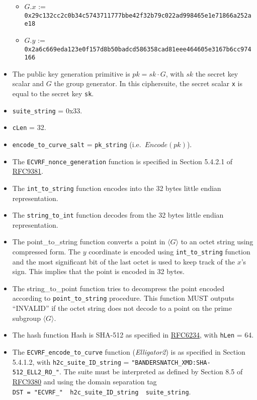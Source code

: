 \documentclass[
]{article}
\providecommand{\tightlist}{%
  \setlength{\itemsep}{0pt}\setlength{\parskip}{0pt}}
\begin{document}
\begin{itemize}
  \begin{itemize}
  \tightlist
  \item
    \(G.x\) :=
    \texttt{0x29c132cc2c0b34c5743711777bbe42f32b79c022ad998465e1e71866a252ae18}
  \item
    \(G.y\) :=
    \texttt{0x2a6c669eda123e0f157d8b50badcd586358cad81eee464605e3167b6cc974166}
  \end{itemize}
\item
  The public key generation primitive is \(pk = sk \cdot G\), with
  \(sk\) the secret key scalar and \(G\) the group generator. In this
  ciphersuite, the secret scalar \texttt{x} is equal to the secret key
  \texttt{sk}.
\item
  \texttt{suite\_string} = 0x33.
\item
  \texttt{cLen} = 32.
\item
  \texttt{encode\_to\_curve\_salt} = \texttt{pk\_string}
  (i.e.~\(Encode(pk)\)).
\item
  The \texttt{ECVRF\_nonce\_generation} function is specified in Section
  5.4.2.1 of \href{https://datatracker.ietf.org/doc/rfc9381/}{RFC9381}.
\item
  The \texttt{int\_to\_string} function encodes into the 32 bytes little
  endian representation.
\item
  The \texttt{string\_to\_int} function decodes from the 32 bytes little
  endian representation.
\item
  The point\_to\_string function converts a point in
  \(\langle G \rangle\) to an octet string using compressed form. The
  \(y\) coordinate is encoded using \texttt{int\_to\_string} function
  and the most significant bit of the last octet is used to keep track
  of the \(x\)'s sign. This implies that the point is encoded in 32
  bytes.
\item
  The string\_to\_point function tries to decompress the point encoded
  according to \texttt{point\_to\_string} procedure. This function MUST
  outputs ``INVALID'' if the octet string does not decode to a point on
  the prime subgroup \(\langle G \rangle\).
\item
  The hash function Hash is SHA-512 as specified in
  \href{https://www.rfc-editor.org/rfc/rfc6234}{RFC6234}, with
  \texttt{hLen} = 64.
\item
  The \texttt{ECVRF\_encode\_to\_curve} function (\emph{Elligator2}) is
  as specified in Section 5.4.1.2, with \texttt{h2c\_suite\_ID\_string}
  = \texttt{"BANDERSNATCH\_XMD:SHA-512\_ELL2\_RO\_"}. The suite must be
  interpreted as defined by Section 8.5 of
  \href{https://datatracker.ietf.org/doc/rfc9380/}{RFC9380} and using
  the domain separation tag
  \texttt{DST\ =\ "ECVRF\_"\ \textbar{}\textbar{}\ h2c\_suite\_ID\_string\ \textbar{}\textbar{}\ suite\_string}.
\end{itemize}
\end{document}
